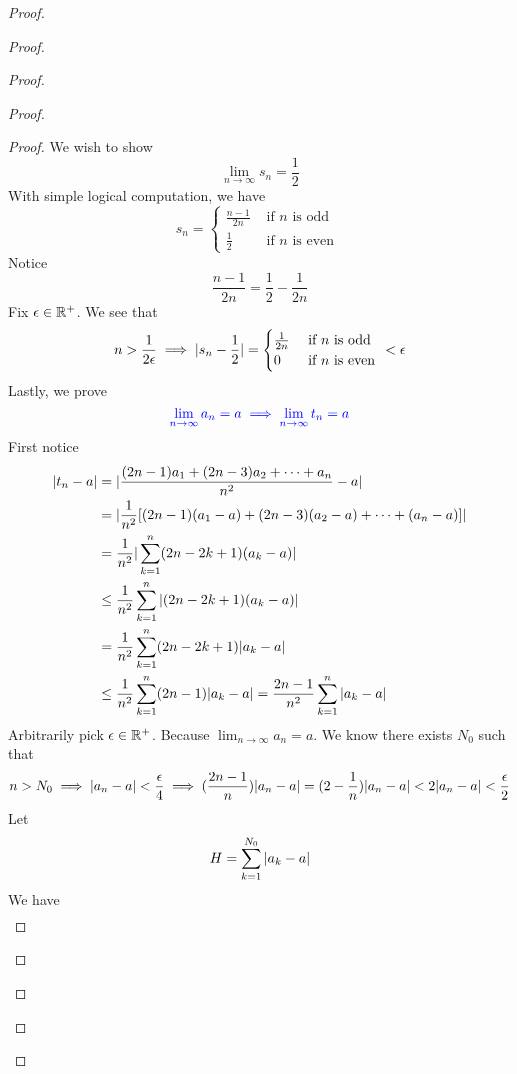 \documentclass{report}
\begin{document}
\begin{proof}
\begin{proof}
\begin{proof}
\begin{proof}
\begin{proof}
We wish to show 
\begin{equation}
\lim_{n\to\infty}s_n=\frac{1}{2}
\end{equation}
With simple logical computation, we have
\begin{equation}
s_n=\begin{cases}
  \frac{n-1}{2n}& \text{ if $n$ is odd }\\
  \frac{1}{2}& \text{ if $n$ is even }
\end{cases}
\end{equation}
Notice 
\begin{equation}
\frac{n-1}{2n}=\frac{1}{2}-\frac{1}{2n}
\end{equation}
Fix $\epsilon \in\mathbb{R}^+$. We see that 
\begin{equation}
n>\frac{1}{2\epsilon }\implies |s_n-\frac{1}{2}|=\begin{cases}
\frac{1}{2n}& \text{ if $n$ is odd }\\
 0& \text{ if $n$ is even } 
\end{cases}<\epsilon 
\end{equation}
Lastly, we prove 
\begin{equation}
\textcolor{blue}{\lim_{n\to\infty}a_n=a\implies \lim_{n\to\infty}t_n=a}
\end{equation}
First notice
\begin{align}
  |t_n-a|&=|\frac{(2n-1)a_1+(2n-3)a_2+\cdots + a_n}{n^2}-a|\\
&=|\frac{1}{n^2}[(2n-1)(a_1-a)+(2n-3)(a_2-a)+\cdots +(a_n-a)]|\\
&=\frac{1}{n^2}|\sum_{k=1}^n (2n-2k+1)(a_k -a)|\\
&\leq \frac{1}{n^2}\sum_{k=1}^n |(2n-2k+1)(a_k-a)|\\
&= \frac{1}{n^2}\sum_{k=1}^n (2n-2k+1)|a_k-a|\\
&\leq \frac{1}{n^2}\sum_{k=1}^n (2n-1)|a_k-a|=\frac{2n-1}{n^2}\sum_{k=1}^n |a_k-a|
\end{align}
Arbitrarily pick $\epsilon \in\mathbb{R}^+$. Because $\lim_{n\to\infty}a_n=a$. We know there exists $N_0$ such that
 \begin{equation}
n>N_0\implies |a_n-a|<\frac{\epsilon }{4}\implies (\frac{2n-1}{n})|a_n-a|=(2-\frac{1}{n})|a_n-a|<2|a_n-a|<\frac{\epsilon}{2} 
\end{equation}
Let
\begin{equation}
H=\sum_{k=1}^{N_0} |a_k-a|
\end{equation}
We have
\begin{align}

\end{align}
\end{proof}
\end{proof}
\end{proof}
\end{proof}
\end{proof}
\end{document}
